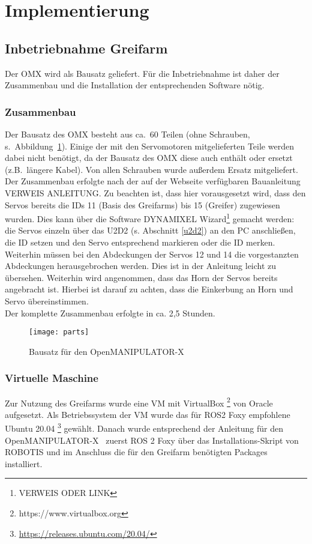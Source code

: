 \section{Implementierung}

\subsection {Inbetriebnahme Greifarm}
Der OMX wird als Bausatz geliefert.
Für die Inbetriebnahme ist daher der Zusammenbau und die Installation der entsprechenden Software nötig.
\subsubsection{Zusammenbau}
Der Bausatz des OMX besteht aus ca.\ 60 Teilen (ohne Schrauben, s.\ Abbildung~\ref{fig:omxparts}).
Einige der mit den Servomotoren mitgelieferten Teile werden dabei nicht benötigt, da der Bausatz des OMX diese auch enthält oder ersetzt (z.B.\ längere Kabel).
Von allen Schrauben wurde außerdem Ersatz mitgeliefert.\\
Der Zusammenbau erfolgte nach der auf der Webseite verfügbaren Bauanleitung VERWEIS ANLEITUNG.
Zu beachten ist, dass hier vorausgesetzt wird, dass den Servos bereits die IDs 11 (Basis des Greifarms) bis 15 (Greifer) zugewiesen wurden.
Dies kann über die Software DYNAMIXEL Wizard{\footnote{VERWEIS ODER LINK}} gemacht werden: die Servos einzeln über das U2D2 (s. Abschnitt {\ref{u2d2}}) an den PC anschließen, die ID setzen und den Servo entsprechend markieren oder die ID merken.
Weiterhin müssen bei den Abdeckungen der Servos 12 und 14 die vorgestanzten Abdeckungen herausgebrochen werden.
Dies ist in der Anleitung leicht zu übersehen.
Weiterhin wird angenommen, dass das Horn der Servos bereits angebracht ist.
Hierbei ist darauf zu achten, dass die Einkerbung an Horn und Servo übereinstimmen.\\
Der komplette Zusammenbau erfolgte in ca. 2,5 Stunden.

\begin{figure}[ht!]
\centering
\texttt{[image: parts]}
\caption{Bausatz für den OpenMANIPULATOR-X}
\label{fig:omxparts}
\end{figure}
\subsubsection{Virtuelle Maschine}
Zur Nutzung des Greifarms wurde eine \ac{VM} mit VirtualBox {\footnote{https://www.virtualbox.org}} von Oracle aufgesetzt.
Als Betriebssystem der \ac{VM} wurde das für ROS2 Foxy empfohlene~\citep{foxyreq} Ubuntu 20.04 {\footnote{\url{https://releases.ubuntu.com/20.04/}}} gewählt.
Danach wurde entsprechend der Anleitung für den OpenMANIPULATOR-X~\citep{foxyinstall} zuerst ROS 2 Foxy über das Installations-Skript von ROBOTIS und im Anschluss die für den Greifarm benötigten Packages installiert.

